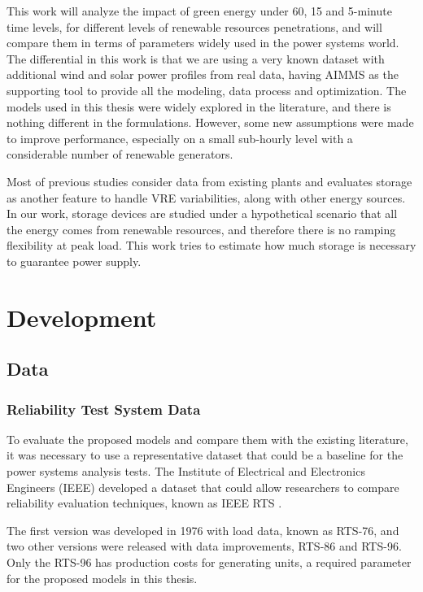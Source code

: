 \documentclass[12pt,LUDisStyle,twosided]{book}
\begin{document}
This work will analyze the impact of green energy under 60, 15 and 5-minute time levels, for different levels of renewable resources penetrations, and will compare them in terms of parameters widely used in the power systems world. The differential in this work is that we are using a very known dataset with additional wind and solar power profiles from real data, having AIMMS as the supporting tool to provide all the modeling, data process and optimization. The models used in this thesis were widely explored in the literature, and there is nothing different in the formulations. However, some new assumptions were made to improve performance, especially on a small sub-hourly level with a considerable number of renewable generators.

Most of previous studies consider data from existing plants and evaluates storage as another feature to handle VRE variabilities, along with other energy sources. In our work, storage devices are studied under a hypothetical scenario that all the energy comes from renewable resources, and therefore there is no ramping flexibility at peak load. This work tries to estimate how much storage is necessary to guarantee power supply.

\chapter{Development}
\section{Data}

\subsection{Reliability Test System Data}

To evaluate the proposed models and compare them with the existing literature, it was necessary to use a representative dataset that could be a baseline for the power systems analysis tests. The Institute of Electrical and Electronics Engineers (IEEE) developed a dataset that could allow researchers to compare reliability evaluation techniques, known as IEEE RTS \cite{wongieee}. 

The first version was developed in 1976 with load data, known as RTS-76, and two other versions were released with data improvements, RTS-86 and RTS-96. Only the RTS-96 has production costs for generating units, a required parameter for the proposed models in this thesis.
\end{document}
